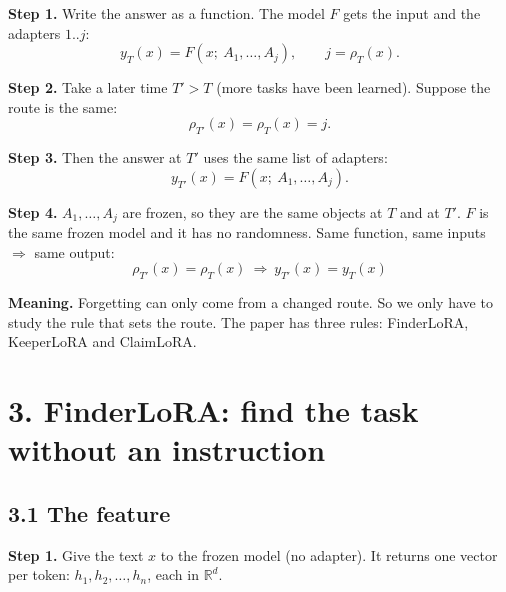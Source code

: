 \documentclass[11pt,a4paper]{article}
\newcommand{\step}[1]{\textbf{Step #1.}}
\begin{document}
\step{1} Write the answer as a function. The model $F$ gets the input and the adapters $1..j$:
\[ y_T(x) = F(x;\ A_1,\dots,A_j), \qquad j=\rho_T(x). \]

\step{2} Take a later time $T' > T$ (more tasks have been learned). Suppose the route is the same:
\[ \rho_{T'}(x) = \rho_T(x) = j. \]

\step{3} Then the answer at $T'$ uses the same list of adapters:
\[ y_{T'}(x) = F(x;\ A_1,\dots,A_j). \]

\step{4} $A_1,\dots,A_j$ are frozen, so they are the same objects at $T$ and at $T'$. $F$ is the same
frozen model and it has no randomness. Same function, same inputs $\Rightarrow$ same output:
\[ \boxed{\ \rho_{T'}(x) = \rho_T(x) \ \Longrightarrow\ y_{T'}(x) = y_T(x)\ } \]

\begin{center}
\end{center}

\textbf{Meaning.} Forgetting can only come from a changed route. So we only have to study the rule
that sets the route. The paper has three rules: FinderLoRA, KeeperLoRA and ClaimLoRA.

\section*{3. FinderLoRA: find the task without an instruction}

\subsection*{3.1 The feature}

\step{1} Give the text $x$ to the frozen model (no adapter). It returns one vector per token:
$h_1, h_2, \dots, h_n$, each in $\mathbb{R}^d$.
\end{document}
